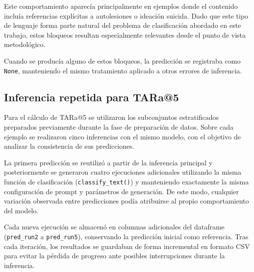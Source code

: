 Este comportamiento aparecía principalmente en ejemplos donde el contenido incluía referencias explícitas a autolesiones o ideación suicida. Dado que este tipo de lenguaje forma parte natural del problema de clasificación abordado en este trabajo, estos bloqueos resultan especialmente relevantes desde el punto de vista metodológico.

Cuando se producía alguno de estos bloqueos, la predicción se registraba como \texttt{None}, manteniendo el mismo tratamiento aplicado a otros errores de inferencia. 

\subsection{Inferencia repetida para TARa@5}

Para el cálculo de TARa@5 se utilizaron los subconjuntos estratificados preparados previamente durante la fase de preparación de datos. Sobre cada ejemplo se realizaron cinco inferencias con el mismo modelo, con el objetivo de analizar la consistencia de sus predicciones.

La primera predicción se reutilizó a partir de la inferencia principal y posteriormente se generaron cuatro ejecuciones adicionales utilizando la misma función de clasificación (\texttt{classify\_text()}) y manteniendo exactamente la misma configuración de prompt y parámetros de generación. De este modo, cualquier variación observada entre predicciones podía atribuirse al propio comportamiento del modelo.

Cada nueva ejecución se almacenó en columnas adicionales del dataframe (\texttt{pred\_run2} a \texttt{pred\_run5}), conservando la predicción inicial como referencia. Tras cada iteración, los resultados se guardaban de forma incremental en formato CSV para evitar la pérdida de progreso ante posibles interrupciones durante la inferencia.

